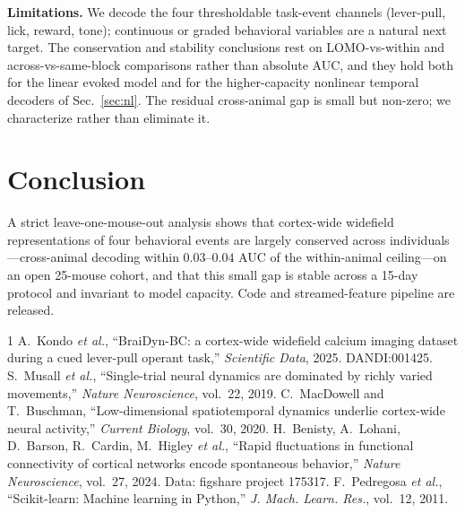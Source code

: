 \documentclass[conference]{IEEEtran}
\begin{document}
\textbf{Limitations.} We decode the four thresholdable task-event channels (lever-pull, lick,
reward, tone); continuous or graded behavioral variables are a natural next target. The
conservation and stability conclusions rest on LOMO-vs-within and across-vs-same-block
comparisons rather than absolute AUC, and they hold both for the linear evoked model and for the
higher-capacity nonlinear temporal decoders of Sec.~\ref{sec:nl}. The residual cross-animal gap
is small but non-zero; we characterize rather than eliminate it.

\section{Conclusion}
A strict leave-one-mouse-out analysis shows that cortex-wide widefield representations of four
behavioral events are largely conserved across individuals---cross-animal decoding within
$0.03$--$0.04$ AUC of the within-animal ceiling---on an open 25-mouse cohort, and that this small
gap is stable across a 15-day protocol and invariant to model capacity. Code and streamed-feature
pipeline are released.

\begin{thebibliography}{1}
 A.~Kondo \emph{et al.}, ``BraiDyn-BC: a cortex-wide widefield calcium imaging
dataset during a cued lever-pull operant task,'' \emph{Scientific Data}, 2025. DANDI:001425.
 S.~Musall \emph{et al.}, ``Single-trial neural dynamics are dominated by
richly varied movements,'' \emph{Nature Neuroscience}, vol.~22, 2019.
 C.~MacDowell and T.~Buschman, ``Low-dimensional spatiotemporal dynamics
underlie cortex-wide neural activity,'' \emph{Current Biology}, vol.~30, 2020.
 H.~Benisty, A.~Lohani, D.~Barson, R.~Cardin, M.~Higley \emph{et al.},
``Rapid fluctuations in functional connectivity of cortical networks encode spontaneous
behavior,'' \emph{Nature Neuroscience}, vol.~27, 2024. Data: figshare project 175317.
 F.~Pedregosa \emph{et al.}, ``Scikit-learn: Machine learning in Python,''
\emph{J. Mach. Learn. Res.}, vol.~12, 2011.
\end{thebibliography}
\end{document}
